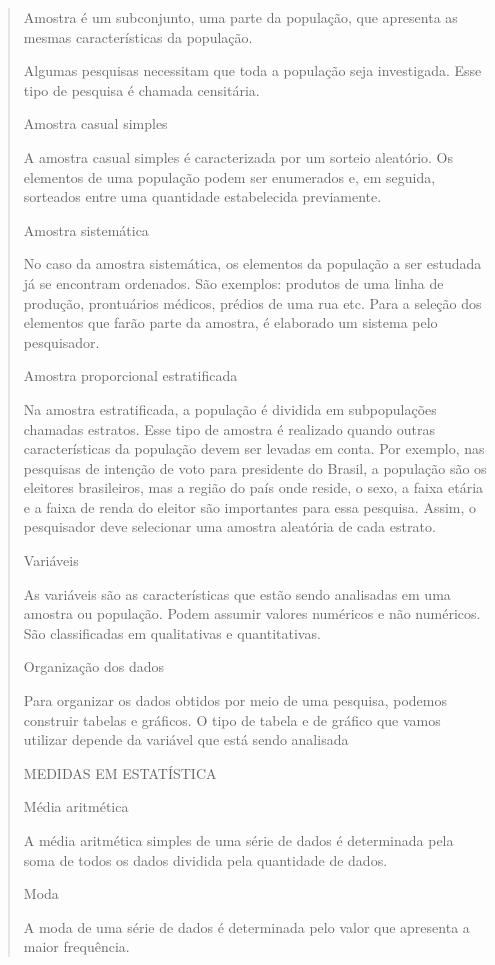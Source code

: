 \begin{quote}
\begin{escolha}
Amostra é um subconjunto, uma parte da população, que apresenta as
mesmas características da população.

Algumas pesquisas necessitam que toda a população seja investigada. Esse
tipo de pesquisa é chamada censitária.

Amostra casual simples

A amostra casual simples é caracterizada por um sorteio aleatório. Os
elementos de uma população podem ser enumerados e, em seguida, sorteados
entre uma quantidade estabelecida previamente.

Amostra sistemática

No caso da amostra sistemática, os elementos da população a ser estudada
já se encontram ordenados. São exemplos: produtos de uma linha de
produção, prontuários médicos, prédios de uma rua etc. Para a seleção
dos elementos que farão parte da amostra, é elaborado um sistema pelo
pesquisador.

Amostra proporcional estratificada

Na amostra estratificada, a população é dividida em subpopulações
chamadas estratos. Esse tipo de amostra é realizado quando outras
características da população devem ser levadas em conta. Por exemplo,
nas pesquisas de intenção de voto para presidente do Brasil, a população
são os eleitores brasileiros, mas a região do país onde reside, o sexo,
a faixa etária e a faixa de renda do eleitor são importantes para essa
pesquisa. Assim, o pesquisador deve selecionar uma amostra aleatória de
cada estrato.

Variáveis

As variáveis são as características que estão sendo analisadas em uma
amostra ou população. Podem assumir valores numéricos e não numéricos.
São classificadas em qualitativas e quantitativas.

Organização dos dados

Para organizar os dados obtidos por meio de uma pesquisa, podemos
construir tabelas e gráficos. O tipo de tabela e de gráfico que vamos
utilizar depende da variável que está sendo analisada

MEDIDAS EM ESTATÍSTICA

Média aritmética

A média aritmética simples de uma série de dados é determinada pela soma
de todos os dados dividida pela quantidade de dados.

Moda

A moda de uma série de dados é determinada pelo valor que apresenta a
maior frequência.


\end{escolha}
\end{quote}
